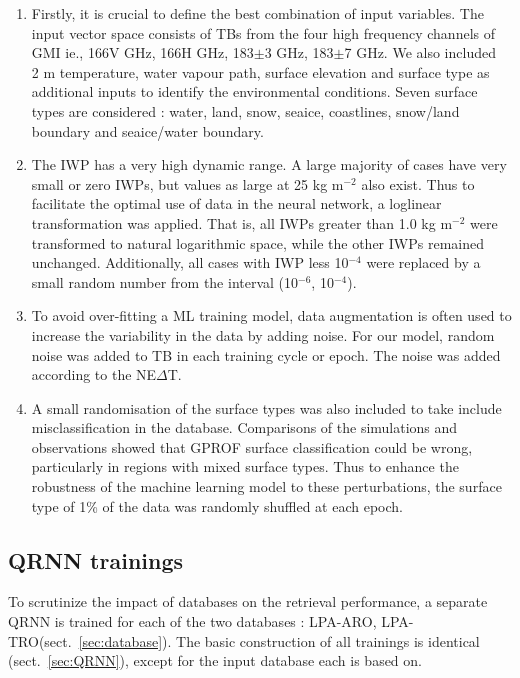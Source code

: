 \documentclass[amt, manuscript]{copernicus}
\begin{document}
\begin{enumerate}
	
	\item  Firstly, it is crucial to define the best combination of input variables. The input vector space consists of TBs from the four high frequency channels of GMI ie., 166V\,\,GHz, 166H\,\,GHz, 183$\pm$3\,\,GHz, 183$\pm$7\,\,GHz. We also included 2\,\,m temperature, water vapour path, surface elevation and surface type as additional inputs to identify the environmental conditions. Seven surface types are considered : water, land, snow, seaice, coastlines, snow/land boundary and seaice/water boundary. 
	
	\item The IWP has a very high dynamic range. A large majority of cases have very small or zero IWPs, but values as large at 25\,\,kg m$^{-2}$ also exist. Thus to facilitate the optimal use of data in the neural network, a loglinear transformation was applied. That is, all IWPs greater than 1.0\,\,kg m$^{-2}$  were transformed to natural logarithmic space, while the other IWPs remained unchanged. Additionally, all cases with IWP less 10$^{-4}$ were replaced by a small random number from the interval (10$^{-6}$, 10$^{-4}$).	
	
	\item To avoid over-fitting a ML training model, data augmentation is often used to increase the variability in the data by adding noise. For our model, random noise was added to TB in each training cycle or epoch. The noise was added according to the NE$\Delta$T. 
	
	\item A small randomisation of the surface types was also included to take include misclassification in the database. Comparisons of the simulations and observations showed that GPROF surface classification could be wrong, particularly in regions with mixed surface types. Thus to enhance the robustness of the machine learning model to these perturbations, the surface type of 1\% of the data was randomly shuffled at each epoch. 	
	
	\end{enumerate}


 
\subsection{QRNN trainings}
\label{sec:qrnn_trainings}
To scrutinize the impact of databases on the retrieval performance, a separate QRNN is trained for each of the two databases : LPA-ARO, LPA-TRO(sect.~\ref{sec:database}). The basic construction of all trainings is identical (sect.~\ref{sec:QRNN}), except for the input database each is based on. 
\end{document}

